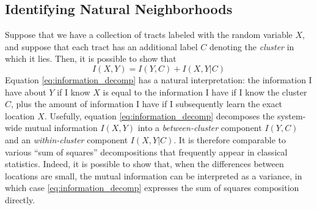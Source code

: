 	\subsection{Identifying Natural Neighborhoods}
		Suppose that we have a collection of tracts labeled with the random variable $X$, and suppose that each tract has an additional label $C$ denoting the \emph{cluster} in which it lies. Then, it is possible to show that 
		\begin{equation}
			I(X,Y) = I(Y,C) + I(X,Y|C) \label{eq:information_decomp}
		\end{equation}
		Equation \eqref{eq:information_decomp} has a natural interpretation: the information I have about $Y$ if I know $X$ is equal to the  information I have if I know the cluster $C$, plus the amount of information I have if I subsequently learn the exact location $X$. Usefully, equation \eqref{eq:information_decomp} decomposes the system-wide mutual information $I(X,Y)$ into a \emph{between-cluster} component $I(Y,C)$ and an \emph{within-cluster} component $I(X,Y|C)$. It is therefore comparable to various ``sum of squares'' decompositions that frequently appear in classical statistics. Indeed, it is possible to show that, when the differences between locations are small, the mutual information can be interpreted as a variance, in which case \eqref{eq:information_decomp} expresses the sum of squares composition directly. 

